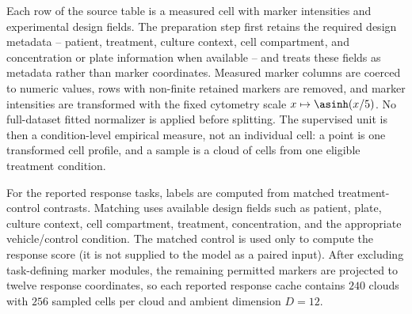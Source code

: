 \documentclass{article}
\theoremstyle{remark}
\theoremstyle{plain}
\begin{document}
Each row of the source table is a measured cell with marker intensities and experimental design fields. The preparation step first retains the required design metadata -- patient, treatment, culture context, cell compartment, and concentration or plate information when available -- and treats these fields as metadata rather than marker coordinates. Measured marker columns are coerced to numeric values, rows with non-finite retained markers are removed, and marker intensities are transformed with the fixed cytometry scale \(x\mapsto \asinh(x/5)\). No full-dataset fitted normalizer is applied before splitting. The supervised unit is then a condition-level empirical measure, not an individual cell: a point is one transformed cell profile, and a sample is a cloud of cells from one eligible treatment condition.

For the reported response tasks, labels are computed from matched treatment-control contrasts\citep{vandewetering2015organoidbiobank,
    vlachogiannis2018organoids, RamosZapatero2023}. Matching uses available design fields such as patient, plate, culture context, cell compartment, treatment, concentration, and the appropriate vehicle/control condition. The matched control is used only to compute the response score (it is not supplied to the model as a paired input). After excluding task-defining marker modules, the remaining permitted markers are projected to twelve response coordinates, so each reported response cache contains \(240\) clouds with \(256\) sampled cells per cloud and ambient dimension \(D=12\).

\end{document}
